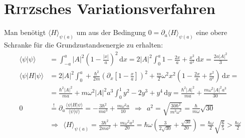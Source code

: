 \documentclass[a4paper,12pt]{article}
\newcommand{\bra}{}
\newcommand{\brak}{}
\newcommand{\braket}{}
\newcommand{\intx}{}
\newcommand{\kla}{}
\begin{document}
\section{\textsc{Ritz}sches Variationsverfahren}
Man benötigt $\bra\langle {H}\rangle_{\psi(a)}$ um aus der Bedingung $0=\partial_a\bra\langle {H}\rangle_{\psi(a)}$ eine obere Schranke für die Grundzustandsenergie zu erhalten:
\begin{align*}
\brak\langle {\psi}| {\psi}\rangle&=\intx\int_{-a}^{a}|A|^2\kla\left( {1-\frac{|x|}{a}} \right)^2\,\mathrm{d}x=2|A|^2\intx\int_{0}^{a}1-\frac{2x}{a}+\frac{x^2}{a^2}\,\mathrm{d}x=\frac{2a|A|^2}{3} \\
\braket\langle {\psi} | {H} | {\psi}\rangle&=2|A|^2\intx\int_{0}^{a}+\frac{\hbar^2}{2m}\kla\left( {\partial_x\kla\left[ {1-\frac{x}{a}} \right]} \right)^2+\frac{m}{2}\omega^2x^2\kla\left( {1-\frac{2x}{a}+\frac{x^2}{a^2}} \right)\,\mathrm{d}x= \\
&=\frac{\hbar^2|A|^2}{ma}+ m\omega^2|A|^2a^3\intx\int_{0}^{1}y^2-2y^3+y^4\,\mathrm{d}y=\frac{\hbar^2|A|^2}{ma}+\frac{m\omega^2|A|^2a^3}{30} \\
0&\overset{!}{=}\partial_a\frac{\braket\langle {\psi} | {H} | {\psi}\rangle}{\brak\langle {\psi}| {\psi}\rangle}=-\frac{3\hbar^2}{ma^3}+\frac{m\omega^2a}{10}\ \ \Rightarrow\ \ a^2=\sqrt{\frac{30\hbar^2}{m^2\omega^2}}=\frac{\hbar}{m\omega}\sqrt{30} \\
&\Rightarrow\ \ \bra\langle {H}\rangle_{\psi(a)}=\frac{3\hbar^2}{2ma^2}+\frac{m\omega^2a^2}{20}=\hbar\omega\kla\left( {\frac{3}{2\sqrt{30}}+\frac{\sqrt{30}}{20}} \right)=\frac{\hbar\omega}{2}\sqrt{\frac{6}{5}}>\frac{\hbar\omega}{2}
\end{align*}
\end{document}
